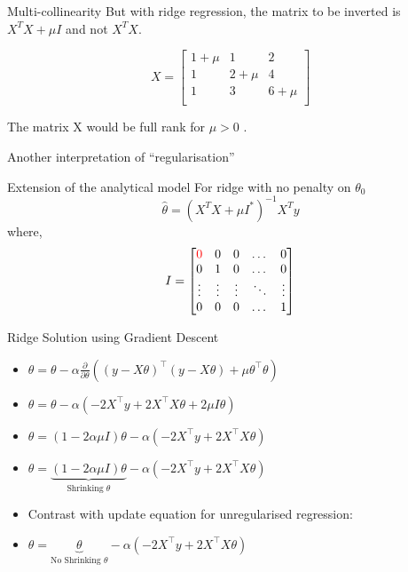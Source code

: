 \documentclass{beamer}
\begin{document}
\begin{frame}{Multi-collinearity}
But with ridge regression, the matrix to be inverted is $X^{T}X + \mu I$ and not $X^{T}X$.

\begin{equation*}
X = \begin{bmatrix}
1+\mu & 1& 2\\
1 & 2+\mu & 4\\
1 & 3& 6+\mu \\
\end{bmatrix}
\end{equation*}

The matrix X would be full rank for $\mu>0$ . 

\pause Another interpretation of ``regularisation''
\end{frame}


\begin{frame}{Extension of the analytical model}
For ridge with no penalty on $\theta_0$
$$
\hat{\theta} = \left(X^TX+\mu I^*\right)^{-1}X^Ty
$$
where, $$I = \begin{bmatrix}
    \color{red}0 & 0 & 0 & \dots  & 0 \\
    0 & 1& 0 & \dots  & 0\\
    \vdots & \vdots & \vdots & \ddots & \vdots \\
    0 & 0 & 0 & \dots  & 1
\end{bmatrix}$$
\end{frame}


{
	
}


{
	
}

\begin{frame}{Ridge Solution using Gradient Descent}
\begin{itemize}[<+->]
	\item \(\theta=\theta - \alpha \frac{\partial}{\partial \theta}(\left(y-X\theta\right)^{\top}\left(y-X\theta\right)+\mu\theta^{\top}\theta)\) 
	\item \(\theta=\theta - \alpha(-2 X^{\top} y+2 X^{\top} X \theta + 2\mu I \theta)\)
	\item \(\theta=(1-2\alpha\mu I)\theta - \alpha(-2 X^{\top} y+2 X^{\top} X \theta)\)
	\item \(\theta=\underbrace{(1-2\alpha\mu I)\theta}_\text{Shrinking $\theta$} - \alpha(-2 X^{\top} y+2 X^{\top} X \theta)\)
\end{itemize}
\pause \begin{itemize}

	\item Contrast with update equation for unregularised regression:
	\item \(\theta=\underbrace{\theta}_\text{No Shrinking $\theta$} - \alpha(-2 X^{\top} y+2 X^{\top} X \theta)\)
	
\end{itemize}

\end{frame}

{
	
}
\end{document}
